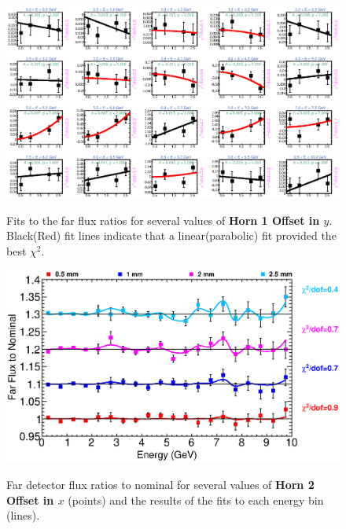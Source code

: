 {\begin{figure}[ht]
  \begin{center}
    {\includegraphics[width=5.0in]{figures/Horn1YOffset_far_fits.eps}}
  \end{center}
\caption{ Fits to the far flux ratios for several values of {\bf Horn 1 Offset in $y$}. Black(Red) fit lines indicate that a linear(parabolic) fit provided the best $\chi^2$. }
\end{figure}

\begin{figure}[ht]
  \begin{center}
    {\includegraphics[width=6.0in]{figures/Horn2XOffset_far_summary.eps}}
  \end{center}
\caption{ Far detector flux ratios to nominal for several values of {\bf Horn 2 Offset in $x$} (points) and the results of the fits to each energy bin (lines).}
\end{figure}

}
